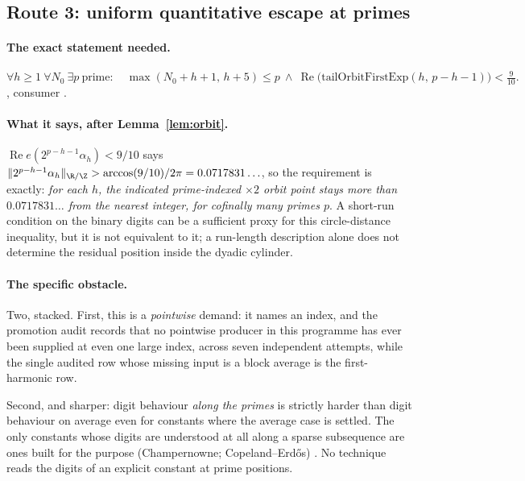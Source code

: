 \subsection{Route 3: uniform quantitative escape at primes}

\paragraph{The exact statement needed.}
\[
  \forall h\ge 1\ \forall N_0\ \exists p\ \text{prime}:\quad
  \max(N_0+h+1,\,h+5)\le p
  \ \wedge\
  \operatorname{Re}\bigl(\mathrm{tailOrbitFirstExp}(h,\,p-h-1)\bigr)<\tfrac{9}{10}.
\]
,
consumer
\quad \ev{Open} \quad \scale{cofinal}.

\paragraph{What it says, after Lemma~\ref{lem:orbit}.}
$\operatorname{Re}e(2^{p-h-1}\alpha_h)<9/10$ says
$\|2^{p-h-1}\alpha_h\|_{\R/\Z}>\arccos(9/10)/2\pi=0.0717831\ldots$, so the
requirement is exactly: \emph{for each $h$, the indicated prime-indexed
$\times2$ orbit point stays more than $0.0717831\ldots$ from the nearest
integer, for cofinally many primes $p$}.  A short-run condition on the binary
digits can be a sufficient proxy for this circle-distance inequality, but it
is not equivalent to it; a run-length description alone does not determine
the residual position inside the dyadic cylinder.

\paragraph{The specific obstacle.} Two, stacked. First, this is a
\emph{pointwise} demand: it names an index, and the promotion audit records
that no pointwise producer in this programme has ever been supplied at even
one large index, across seven independent attempts, while the single audited
row whose missing input is a block average is the first-harmonic row.

Second, and sharper: digit behaviour \emph{along the primes} is strictly
harder than digit behaviour on average even for constants where the average
case is settled. The only constants whose digits are understood at all along a sparse
subsequence are ones built for the purpose (Champernowne;
Copeland--Erd\H{o}s) . No technique reads the digits of an
explicit constant at prime positions.

